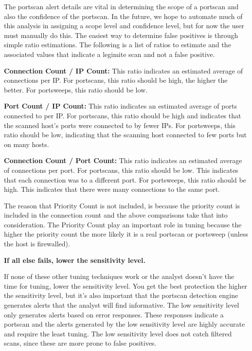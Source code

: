 \documentclass[english]{report}
\newcounter{slistnum}
\newenvironment{slist}
{ \begin{list}{ {\bf \arabic{slistnum}.} }{\usecounter{slistnum} } }
{ \end{list} }
\begin{document}
\begin{slist}
     The portscan alert details are vital in determining the scope of a portscan
     and also the confidence of the portscan.  In the future, we hope to
     automate much of this analysis in assigning a scope level and confidence
     level, but for now the user must manually do this.  The easiest way to
     determine false positives is through simple ratio estimations.  The
     following is a list of ratios to estimate and the associated values that
     indicate a legimite scan and not a false positive.
     
     \textbf{Connection Count / IP Count:}  This ratio indicates an estimated average of
     connections per IP.  For portscans, this ratio should be high, the higher
     the better.  For portsweeps, this ratio should be low.
     
     \textbf{Port Count / IP Count:}  This ratio indicates an estimated average of ports
     connected to per IP.  For portscans, this ratio should be high and
     indicates that the scanned host's ports were connected to by fewer IPs. 
     For portsweeps, this ratio should be low, indicating that the scanning host
     connected to few ports but on many hosts.
     
     \textbf{Connection Count / Port Count:}  This ratio indicates an estimated average
     of connections per port.  For portscans, this ratio should be low.  This
     indicates that each connection was to a different port.  For portsweeps,
     this ratio should be high.  This indicates that there were many connections
     to the same port.
     
     The reason that Priority Count is not included, is because the priority
     count is included in the connection count and the above comparisons take
     that into consideration.  The Priority Count play an important role in
     tuning because the higher the priority count the more likely it is a real
     portscan or portsweep (unless the host is firewalled).
     
\item \textbf{If all else fails, lower the sensitivity level.}
     
     If none of these other tuning techniques work or the analyst doesn't have
     the time for tuning, lower the sensitivity level.  You get the best
     protection the higher the sensitivity level, but it's also important that
     the portscan detection engine generates alerts that the analyst will find
     informative.  The low sensitivity level only generates alerts based on
     error responses.  These responses indicate a portscan and the alerts
     generated by the low sensitivity level are highly accurate and require the
     least tuning.  The low sensitivity level does not catch filtered scans,
     since these are more prone to false positives.
\end{slist}
\end{document}

